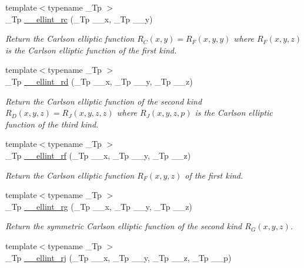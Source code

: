 \begin{DoxyCompactItemize}
\item 
{\footnotesize template$<$typename \+\_\+\+Tp $>$ }\\\+\_\+\+Tp \hyperlink{namespacestd_1_1____detail_aa7d81e41240a6d031414c6b117889e36}{\+\_\+\+\_\+ellint\+\_\+rc} (\+\_\+\+Tp \+\_\+\+\_\+x, \+\_\+\+Tp \+\_\+\+\_\+y)
\begin{DoxyCompactList}\small\item\em Return the Carlson elliptic function $ R_C(x,y) = R_F(x,y,y) $ where $ R_F(x,y,z) $ is the Carlson elliptic function of the first kind. \end{DoxyCompactList}\item 
{\footnotesize template$<$typename \+\_\+\+Tp $>$ }\\\+\_\+\+Tp \hyperlink{namespacestd_1_1____detail_ac05883415a662fc6f9855dd8d1da921f}{\+\_\+\+\_\+ellint\+\_\+rd} (\+\_\+\+Tp \+\_\+\+\_\+x, \+\_\+\+Tp \+\_\+\+\_\+y, \+\_\+\+Tp \+\_\+\+\_\+z)
\begin{DoxyCompactList}\small\item\em Return the Carlson elliptic function of the second kind $ R_D(x,y,z) = R_J(x,y,z,z) $ where $ R_J(x,y,z,p) $ is the Carlson elliptic function of the third kind. \end{DoxyCompactList}\item 
{\footnotesize template$<$typename \+\_\+\+Tp $>$ }\\\+\_\+\+Tp \hyperlink{namespacestd_1_1____detail_a2cca271dcbdf22923219eab7a02450d5}{\+\_\+\+\_\+ellint\+\_\+rf} (\+\_\+\+Tp \+\_\+\+\_\+x, \+\_\+\+Tp \+\_\+\+\_\+y, \+\_\+\+Tp \+\_\+\+\_\+z)
\begin{DoxyCompactList}\small\item\em Return the Carlson elliptic function $ R_F(x,y,z) $ of the first kind. \end{DoxyCompactList}\item 
{\footnotesize template$<$typename \+\_\+\+Tp $>$ }\\\+\_\+\+Tp \hyperlink{namespacestd_1_1____detail_aaceff1eb320e0602afee36c60b80f87a}{\+\_\+\+\_\+ellint\+\_\+rg} (\+\_\+\+Tp \+\_\+\+\_\+x, \+\_\+\+Tp \+\_\+\+\_\+y, \+\_\+\+Tp \+\_\+\+\_\+z)
\begin{DoxyCompactList}\small\item\em Return the symmetric Carlson elliptic function of the second kind $ R_G(x,y,z) $. \end{DoxyCompactList}\item 
{\footnotesize template$<$typename \+\_\+\+Tp $>$ }\\\+\_\+\+Tp \hyperlink{namespacestd_1_1____detail_afe05ce66130b5f47389137c3f9aa6949}{\+\_\+\+\_\+ellint\+\_\+rj} (\+\_\+\+Tp \+\_\+\+\_\+x, \+\_\+\+Tp \+\_\+\+\_\+y, \+\_\+\+Tp \+\_\+\+\_\+z, \+\_\+\+Tp \+\_\+\+\_\+p)

\end{DoxyCompactItemize}
